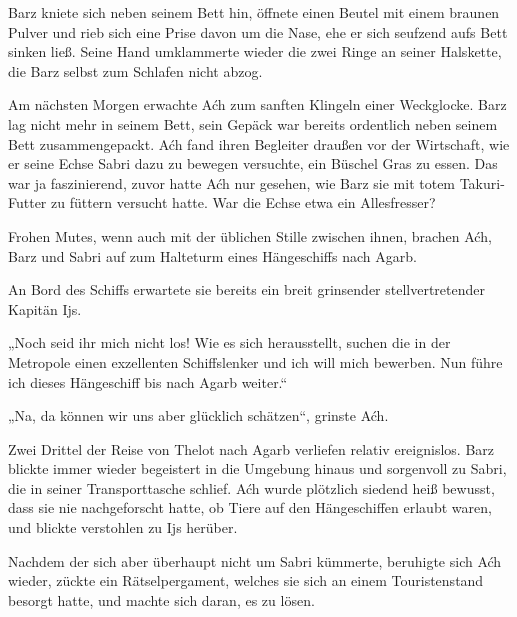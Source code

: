 
Barz kniete sich neben seinem Bett hin, öffnete einen Beutel mit einem braunen Pulver und rieb sich eine Prise davon um die Nase, ehe er sich seufzend aufs Bett sinken ließ. Seine Hand umklammerte wieder die zwei Ringe an seiner Halskette, die Barz selbst zum Schlafen nicht abzog.

Am nächsten Morgen erwachte Aćh zum sanften Klingeln einer Weckglocke. Barz lag nicht mehr in seinem Bett, sein Gepäck war bereits ordentlich neben seinem Bett zusammengepackt. Aćh fand ihren Begleiter draußen vor der Wirtschaft, wie er seine Echse Sabri dazu zu bewegen versuchte, ein Büschel Gras zu essen. Das war ja faszinierend, zuvor hatte Aćh nur gesehen, wie Barz sie mit totem Takuri-Futter zu füttern versucht hatte. War die Echse etwa ein Allesfresser?

Frohen Mutes, wenn auch mit der üblichen Stille zwischen ihnen, brachen Aćh, Barz und Sabri auf zum Halteturm eines Hängeschiffs nach Agarb.

An Bord des Schiffs erwartete sie bereits ein breit grinsender stellvertretender Kapitän Ijs.

„Noch seid ihr mich nicht los! Wie es sich herausstellt, suchen die in der Metropole einen exzellenten Schiffslenker und ich will mich bewerben. Nun führe ich dieses Hängeschiff bis nach Agarb weiter.“

„Na, da können wir uns aber glücklich schätzen“, grinste Aćh.



\trennzeichen



Zwei Drittel der Reise von Thelot nach Agarb verliefen relativ ereignislos. Barz blickte immer wieder begeistert in die Umgebung hinaus und sorgenvoll zu Sabri, die in seiner Transporttasche schlief. Aćh wurde plötzlich siedend heiß bewusst, dass sie nie nachgeforscht hatte, ob Tiere auf den Hängeschiffen erlaubt waren, und blickte verstohlen zu Ijs herüber.

Nachdem der sich aber überhaupt nicht um Sabri kümmerte, beruhigte sich Aćh wieder, zückte ein Rätselpergament, welches sie sich an einem Touristenstand besorgt hatte, und machte sich daran, es zu lösen.

